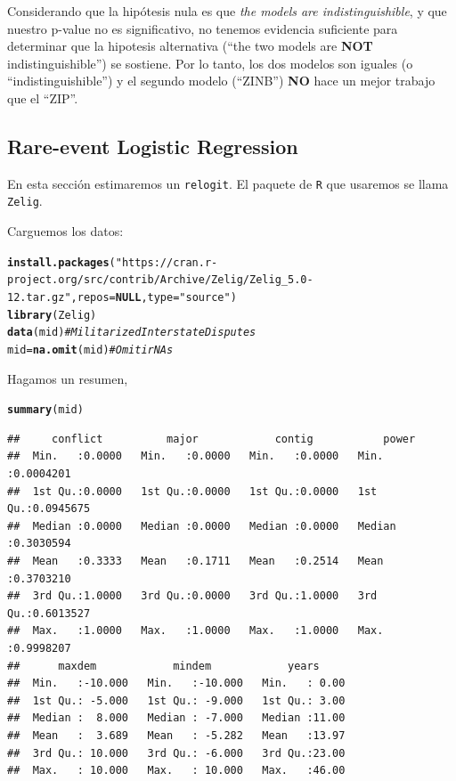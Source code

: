 \documentclass[onesided]{article}\usepackage[]{graphicx}\usepackage[]{color}
\makeatletter
\newcommand{\hlstr}[1]{\textcolor[rgb]{0.192,0.494,0.8}{#1}}%
\newcommand{\hlcom}[1]{\textcolor[rgb]{0.678,0.584,0.686}{\textit{#1}}}%
\newcommand{\hlstd}[1]{\textcolor[rgb]{0.345,0.345,0.345}{#1}}%
\newcommand{\hlkwa}[1]{\textcolor[rgb]{0.161,0.373,0.58}{\textbf{#1}}}%
\newcommand{\hlkwb}[1]{\textcolor[rgb]{0.69,0.353,0.396}{#1}}%
\newcommand{\hlkwc}[1]{\textcolor[rgb]{0.333,0.667,0.333}{#1}}%
\newcommand{\hlkwd}[1]{\textcolor[rgb]{0.737,0.353,0.396}{\textbf{#1}}}%
\newenvironment{kframe}{%
 \def\at@end@of@kframe{}%
 \ifinner\ifhmode%
  \def\at@end@of@kframe{\end{minipage}}%
  \begin{minipage}{\columnwidth}%
 \fi\fi%
 \def\FrameCommand##1{\hskip\@totalleftmargin \hskip-\fboxsep
 \colorbox{shadecolor}{##1}\hskip-\fboxsep
     \hskip-\linewidth \hskip-\@totalleftmargin \hskip\columnwidth}%
 \MakeFramed {\advance\hsize-\width
   \@totalleftmargin\z@ \linewidth\hsize
   \@setminipage}}%
 {\par\unskip\endMakeFramed%
 \at@end@of@kframe}
\newenvironment{knitrout}{}{} %
\makeatother
\begin{document}
Considerando que la hip\'otesis nula es que \emph{the models are indistinguishible}, y que nuestro p-value no es significativo, no tenemos evidencia suficiente para determinar que la hipotesis alternativa (``the two models are {\bf NOT} indistinguishible'') se sostiene. Por lo tanto, los dos modelos son iguales (o ``indistinguishible'') y el segundo modelo (``ZINB'') {\bf NO} hace un mejor trabajo que el ``ZIP''.

\subsection{Rare-event Logistic Regression}

En esta secci\'on estimaremos un \texttt{relogit}. El paquete de \texttt{R} que usaremos se llama \texttt{Zelig}. 


Carguemos los datos:

\begin{knitrout}
\color{fgcolor}\begin{kframe}
\begin{alltt}
\hlkwd{install.packages}\hlstd{(}\hlstr{"https://cran.r-project.org/src/contrib/Archive/Zelig/Zelig_5.0-12.tar.gz"}\hlstd{,} \hlkwc{repos}\hlstd{=}\hlkwa{NULL}\hlstd{,} \hlkwc{type}\hlstd{=}\hlstr{"source"}\hlstd{)}
\hlkwd{library}\hlstd{(Zelig)}
\hlkwd{data}\hlstd{(mid)} \hlcom{# Militarized Interstate Disputes}
\hlstd{mid} \hlkwb{=} \hlkwd{na.omit}\hlstd{(mid)} \hlcom{# Omitir NAs}
\end{alltt}
\end{kframe}
\end{knitrout}

Hagamos un resumen,

\begin{knitrout}
\color{fgcolor}\begin{kframe}
\begin{alltt}
\hlkwd{summary}\hlstd{(mid)}
\end{alltt}
\begin{verbatim}
##     conflict          major            contig           power          
##  Min.   :0.0000   Min.   :0.0000   Min.   :0.0000   Min.   :0.0004201  
##  1st Qu.:0.0000   1st Qu.:0.0000   1st Qu.:0.0000   1st Qu.:0.0945675  
##  Median :0.0000   Median :0.0000   Median :0.0000   Median :0.3030594  
##  Mean   :0.3333   Mean   :0.1711   Mean   :0.2514   Mean   :0.3703210  
##  3rd Qu.:1.0000   3rd Qu.:0.0000   3rd Qu.:1.0000   3rd Qu.:0.6013527  
##  Max.   :1.0000   Max.   :1.0000   Max.   :1.0000   Max.   :0.9998207  
##      maxdem            mindem            years      
##  Min.   :-10.000   Min.   :-10.000   Min.   : 0.00  
##  1st Qu.: -5.000   1st Qu.: -9.000   1st Qu.: 3.00  
##  Median :  8.000   Median : -7.000   Median :11.00  
##  Mean   :  3.689   Mean   : -5.282   Mean   :13.97  
##  3rd Qu.: 10.000   3rd Qu.: -6.000   3rd Qu.:23.00  
##  Max.   : 10.000   Max.   : 10.000   Max.   :46.00
\end{verbatim}
\end{kframe}
\end{knitrout}
\end{document}
